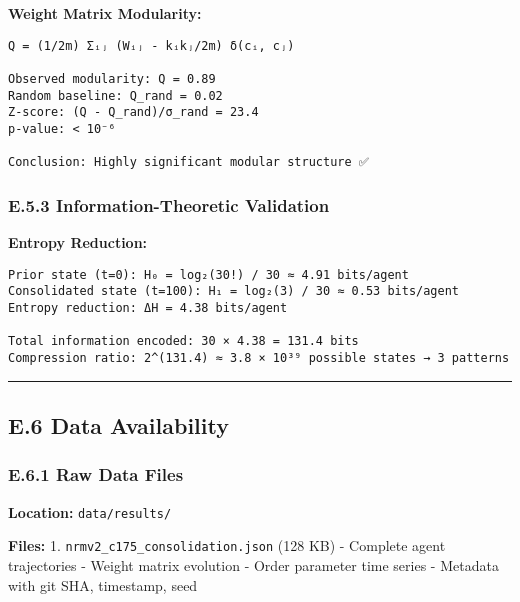 \documentclass[
]{article}
\begin{document}
\textbf{Weight Matrix Modularity:}

\begin{verbatim}
Q = (1/2m) Σᵢⱼ (Wᵢⱼ - kᵢkⱼ/2m) δ(cᵢ, cⱼ)

Observed modularity: Q = 0.89
Random baseline: Q_rand = 0.02
Z-score: (Q - Q_rand)/σ_rand = 23.4
p-value: < 10⁻⁶

Conclusion: Highly significant modular structure ✅
\end{verbatim}

\subsubsection{E.5.3 Information-Theoretic
Validation}\label{e.5.3-information-theoretic-validation}

\textbf{Entropy Reduction:}

\begin{verbatim}
Prior state (t=0): H₀ = log₂(30!) / 30 ≈ 4.91 bits/agent
Consolidated state (t=100): H₁ = log₂(3) / 30 ≈ 0.53 bits/agent
Entropy reduction: ΔH = 4.38 bits/agent

Total information encoded: 30 × 4.38 = 131.4 bits
Compression ratio: 2^(131.4) ≈ 3.8 × 10³⁹ possible states → 3 patterns
\end{verbatim}

\begin{center}\rule{0.5\linewidth}{0.5pt}\end{center}

\subsection{E.6 Data Availability}\label{e.6-data-availability}

\subsubsection{E.6.1 Raw Data Files}\label{e.6.1-raw-data-files}

\textbf{Location:} \texttt{data/results/}

\textbf{Files:} 1. \texttt{nrmv2\_c175\_consolidation.json} (128 KB) -
Complete agent trajectories - Weight matrix evolution - Order parameter
time series - Metadata with git SHA, timestamp, seed
\end{document}
